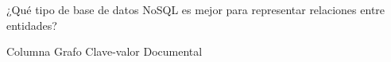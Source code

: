 \question[1] ¿Qué tipo de base de datos NoSQL es mejor para representar relaciones entre entidades?
\begin{choices}
\choice Columna
\CorrectChoice Grafo
\choice Clave-valor
\choice Documental
\end{choices}
